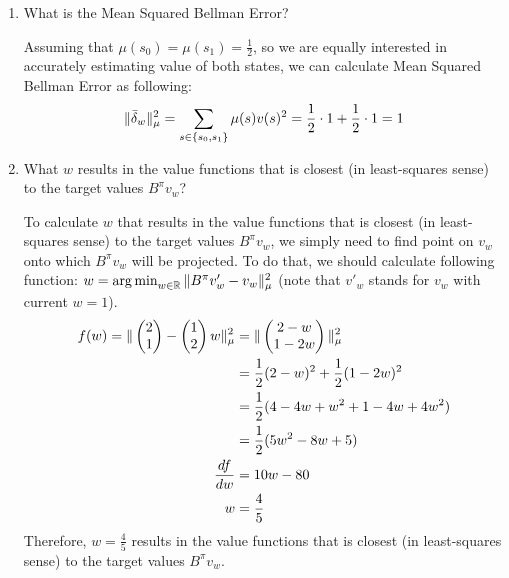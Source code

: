 \documentclass{exam}
\begin{document}
\begin{problem}
\begin{enumerate}
\begin{solutionorlines}[2in]
    \end{solutionorlines}
    \item What is the Mean Squared Bellman Error?
    \begin{solutionorlines}[2in]
    Assuming that $\mu(s_0) = \mu(s_1) = \frac{1}{2}$, so we are equally interested in accurately estimating value of both states, we can calculate Mean Squared Bellman Error as following:
    \begin{align*}
        \|\bar{\delta}_w\|_{\mu}^2 = \sum_{s \in \{s_0, s_1\}} \mu(s) v(s)^2 = \frac{1}{2} \cdot 1 + \frac{1}{2} \cdot 1 = 1
    \end{align*}
    \end{solutionorlines}
    \item What $w$ results in the value functions that is closest (in least-squares sense) to the target values $B^{\pi} v_w$?
    \begin{solutionorlines}[2in]
    To calculate $w$ that results in the value functions that is closest (in least-squares sense) to the target values $B^{\pi} v_w$, we simply need to find point on $v_w$ onto which $B^{\pi}v_w$ will be projected. To do that, we should calculate following function: $w = \operatorname*{arg\,min}_{w \in \operatorname*{\mathbb{R}}}\|B^{\pi} v'_w - v_w\|^2_{\mu}$ (note that $v'_w$ stands for $v_w$ with current $w=1$).
    \begin{align*}
        f(w) = \|\begin{pmatrix}
        2\\
        1
        \end{pmatrix} - \begin{pmatrix}
        1\\
        2
        \end{pmatrix} w
        \|_{\mu}^2 &= \|
            \begin{pmatrix}
            2 - w\\
            1 - 2w
            \end{pmatrix}
        \|_{\mu}^2\\
        &= \frac{1}{2}(2 - w)^2 + \frac{1}{2} (1 - 2w)^2 \\
        &= \frac{1}{2}(4 -4w+w^2 + 1-4w+4w^2)\\
        &= \frac{1}{2}(5w^2-8w+5)\\
        \frac{df}{dw} &= 10w - 8 0\\
        w &= \frac{4}{5}
    \end{align*}
    Therefore, $w=\frac{4}{5}$ results in the value functions that is closest (in least-squares sense) to the target values $B^{\pi} v_w$.

\end{solutionorlines}
\end{enumerate}
\end{problem}
\end{document}
